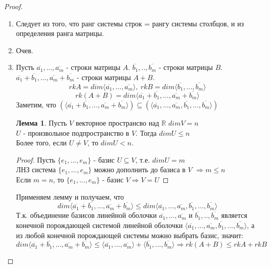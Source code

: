 \documentclass[a4paper, 12pt]{article}
\newcommand{\R}{\mathbb R}
\theoremstyle{definition}
\newtheorem*{lemma}{Лемма}
\begin{document}
  \begin{proof}
    \begin{enumerate}
      \item Следует из того, что ранг системы строк = рангу системы столбцов, и из определения ранга матрицы.
      \item Очев. 
      \item Пусть $\overline{a_1},...,\overline{a_m}$ - строки матрицы $A$. $\overline{b_1},..,\overline{b_m}$  - строки матрицы $B$. \\
      $\overline{a_1} + \overline{b_1} ,..., \overline{a_m} + \overline{b_m}$ - строки матрицы $A+B$. 
      $$rkA = dim \langle \overline{a_1},...,\overline{a_m} \rangle, \ rkB = dim \langle \overline{b_1},...,\overline{b_m} \rangle$$   
      $$rk(A+B) = dim \langle \overline{a_1} + \overline{b_1} ,..., \overline{a_m} + \overline{b_m} \rangle$$ 
      Заметим, что $(\langle \overline{a_1} + \overline{b_1} ,..., \overline{a_m} + \overline{b_m} \rangle) \subseteq (\langle \overline{a_1},...,\overline{a_m}, \overline{b_1},...,\overline{b_m} \rangle)$   
      \begin{lemma}
        Пусть $V$ векторное пространсво над $\R$ $dimV = n$  \\
        $U$ -  произвольное подпространство в $V$. Тогда $dimU\leq n$ \\
        Более того, если $U \neq V$, то $dimU<n$.
      \end{lemma} 
      \begin{proof} 
        Пусть $\{e_1,...,e_m\}$ - базис $U \subseteq V$, т.е. $dimU = m$ \\
        ЛНЗ система $\{e_1,...,e_m\}$ можно дополнить до базиса в $V$ $\Longrightarrow m\leq n$  \\
        Если $m = n$, то $\{e_1,...,e_m\}$ - базис $V \Longrightarrow V=U$
      \end{proof} 
      Применяем лемму и получаем, что 
      $$dim\langle \overline{a_1} + \overline{b_1} ,..., \overline{a_m} + \overline{b_m} \rangle \leq dim\langle \overline{a_1},...,\overline{a_m}, \overline{b_1},...,\overline{b_m} \rangle$$ 
      Т.к. объединение базисов линейной оболочки $\overline{a_1},...,\overline{a_m}$ и $\overline{b_1},..,\overline{b_m}$ является конечной порождающей системой линейной оболочки $\langle \overline{a_1},...,\overline{a_m}, \overline{b_1},...,\overline{b_m} \rangle$, а из любой конечной порождающей системы можно выбрать базис, значит: $$dim\langle \overline{a_1} + \overline{b_1} ,..., \overline{a_m} + \overline{b_m} \rangle \leq \langle \overline{a_1},...,\overline{a_m} \rangle + \langle \overline{b_1},...,\overline{b_m} \rangle \Longrightarrow  rk(A+B) \leq rkA + rkB$$

\end{enumerate}
\end{proof}
\end{document}

